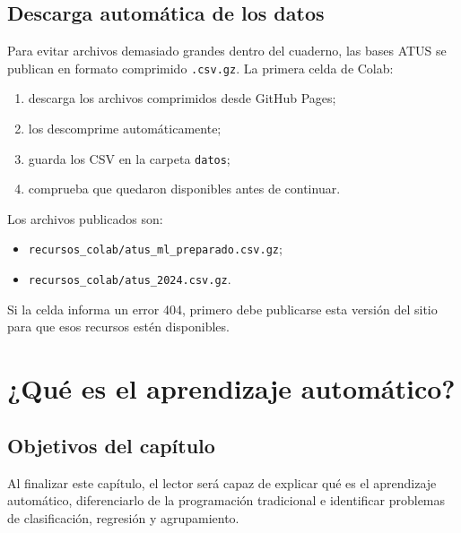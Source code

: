\documentclass[
  spanish,
  10.5pt,
  letterpaper,
  openany,
  headings=big]{scrbook}
\providecommand{\tightlist}{%
  \setlength{\itemsep}{0pt}\setlength{\parskip}{0pt}}
\begin{document}
\section*{Descarga automática de los
datos}\label{descarga-automuxe1tica-de-los-datos}


Para evitar archivos demasiado grandes dentro del cuaderno, las bases
ATUS se publican en formato comprimido \texttt{.csv.gz}. La primera
celda de Colab:

\begin{enumerate}
\def\labelenumi{\arabic{enumi}.}
\tightlist
\item
  descarga los archivos comprimidos desde GitHub Pages;
\item
  los descomprime automáticamente;
\item
  guarda los CSV en la carpeta \texttt{datos};
\item
  comprueba que quedaron disponibles antes de continuar.
\end{enumerate}

Los archivos publicados son:

\begin{itemize}
\tightlist
\item
  \texttt{recursos\_colab/atus\_ml\_preparado.csv.gz};
\item
  \texttt{recursos\_colab/atus\_2024.csv.gz}.
\end{itemize}

Si la celda informa un error 404, primero debe publicarse esta versión
del sitio para que esos recursos estén disponibles.


\chapter{¿Qué es el aprendizaje
automático?}\label{quuxe9-es-el-aprendizaje-automuxe1tico}

\section{Objetivos del capítulo}\label{objetivos-del-capuxedtulo}

Al finalizar este capítulo, el lector será capaz de explicar qué es el
aprendizaje automático, diferenciarlo de la programación tradicional e
identificar problemas de clasificación, regresión y agrupamiento.
\end{document}
